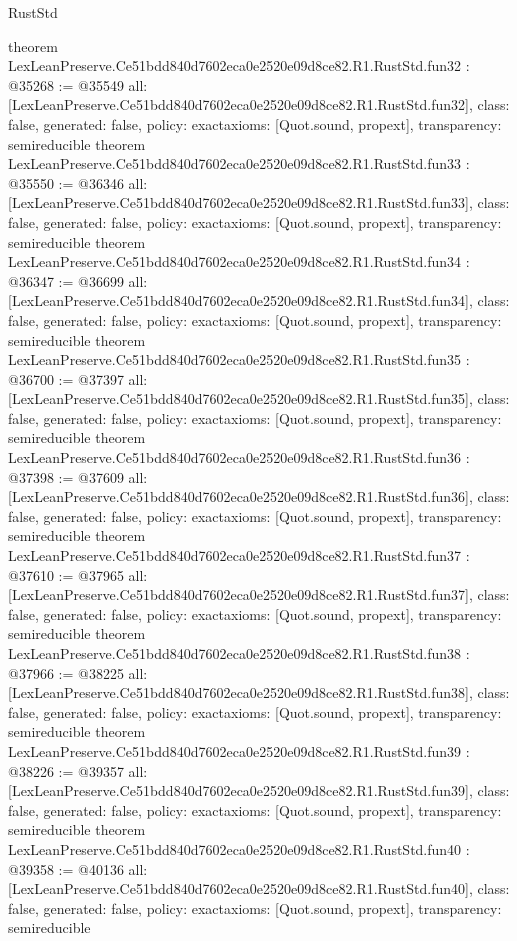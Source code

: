 \begin{lexlean}{RustStd}
\begin{coremodule}
{}
theorem LexLeanPreserve.Ce51bdd840d7602eca0e2520e09d8ce82.R1.RustStd.fun32 : @35268 := @35549 {
  all: [LexLeanPreserve.Ce51bdd840d7602eca0e2520e09d8ce82.R1.RustStd.fun32],
  class: false,
  generated: false,
  policy: exact{axioms: [Quot.sound, propext]},
  transparency: semireducible
}
theorem LexLeanPreserve.Ce51bdd840d7602eca0e2520e09d8ce82.R1.RustStd.fun33 : @35550 := @36346 {
  all: [LexLeanPreserve.Ce51bdd840d7602eca0e2520e09d8ce82.R1.RustStd.fun33],
  class: false,
  generated: false,
  policy: exact{axioms: [Quot.sound, propext]},
  transparency: semireducible
}
theorem LexLeanPreserve.Ce51bdd840d7602eca0e2520e09d8ce82.R1.RustStd.fun34 : @36347 := @36699 {
  all: [LexLeanPreserve.Ce51bdd840d7602eca0e2520e09d8ce82.R1.RustStd.fun34],
  class: false,
  generated: false,
  policy: exact{axioms: [Quot.sound, propext]},
  transparency: semireducible
}
theorem LexLeanPreserve.Ce51bdd840d7602eca0e2520e09d8ce82.R1.RustStd.fun35 : @36700 := @37397 {
  all: [LexLeanPreserve.Ce51bdd840d7602eca0e2520e09d8ce82.R1.RustStd.fun35],
  class: false,
  generated: false,
  policy: exact{axioms: [Quot.sound, propext]},
  transparency: semireducible
}
theorem LexLeanPreserve.Ce51bdd840d7602eca0e2520e09d8ce82.R1.RustStd.fun36 : @37398 := @37609 {
  all: [LexLeanPreserve.Ce51bdd840d7602eca0e2520e09d8ce82.R1.RustStd.fun36],
  class: false,
  generated: false,
  policy: exact{axioms: [Quot.sound, propext]},
  transparency: semireducible
}
theorem LexLeanPreserve.Ce51bdd840d7602eca0e2520e09d8ce82.R1.RustStd.fun37 : @37610 := @37965 {
  all: [LexLeanPreserve.Ce51bdd840d7602eca0e2520e09d8ce82.R1.RustStd.fun37],
  class: false,
  generated: false,
  policy: exact{axioms: [Quot.sound, propext]},
  transparency: semireducible
}
theorem LexLeanPreserve.Ce51bdd840d7602eca0e2520e09d8ce82.R1.RustStd.fun38 : @37966 := @38225 {
  all: [LexLeanPreserve.Ce51bdd840d7602eca0e2520e09d8ce82.R1.RustStd.fun38],
  class: false,
  generated: false,
  policy: exact{axioms: [Quot.sound, propext]},
  transparency: semireducible
}
theorem LexLeanPreserve.Ce51bdd840d7602eca0e2520e09d8ce82.R1.RustStd.fun39 : @38226 := @39357 {
  all: [LexLeanPreserve.Ce51bdd840d7602eca0e2520e09d8ce82.R1.RustStd.fun39],
  class: false,
  generated: false,
  policy: exact{axioms: [Quot.sound, propext]},
  transparency: semireducible
}
theorem LexLeanPreserve.Ce51bdd840d7602eca0e2520e09d8ce82.R1.RustStd.fun40 : @39358 := @40136 {
  all: [LexLeanPreserve.Ce51bdd840d7602eca0e2520e09d8ce82.R1.RustStd.fun40],
  class: false,
  generated: false,
  policy: exact{axioms: [Quot.sound, propext]},
  transparency: semireducible
}
\end{coremodule}
\end{lexlean}
